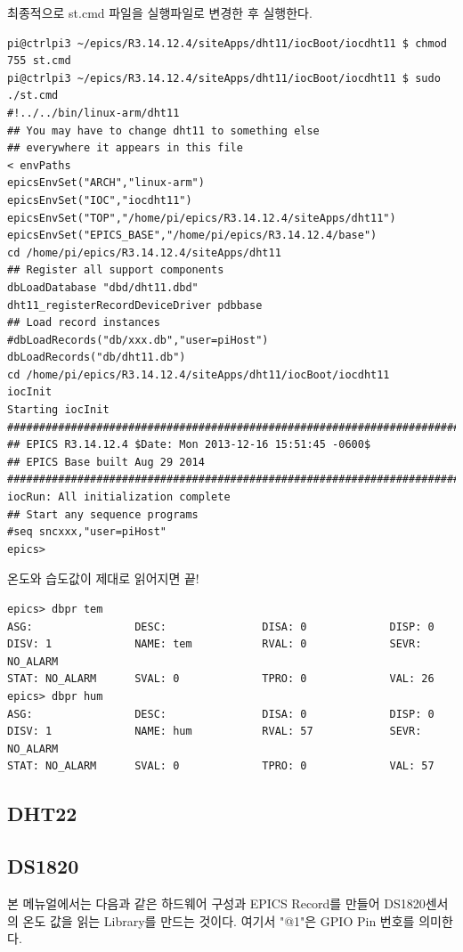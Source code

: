 \documentclass[11pt
  , a4paper
  , article
  , oneside
]{memoir}
\begin{document}
최종적으로 st.cmd 파일을 실행파일로 변경한 후 실행한다.
\begin{lstlisting}[style=termstyle]
pi@ctrlpi3 ~/epics/R3.14.12.4/siteApps/dht11/iocBoot/iocdht11 $ chmod 755 st.cmd
pi@ctrlpi3 ~/epics/R3.14.12.4/siteApps/dht11/iocBoot/iocdht11 $ sudo ./st.cmd
#!../../bin/linux-arm/dht11
## You may have to change dht11 to something else
## everywhere it appears in this file
< envPaths
epicsEnvSet("ARCH","linux-arm")
epicsEnvSet("IOC","iocdht11")
epicsEnvSet("TOP","/home/pi/epics/R3.14.12.4/siteApps/dht11")
epicsEnvSet("EPICS_BASE","/home/pi/epics/R3.14.12.4/base")
cd /home/pi/epics/R3.14.12.4/siteApps/dht11
## Register all support components
dbLoadDatabase "dbd/dht11.dbd"
dht11_registerRecordDeviceDriver pdbbase
## Load record instances
#dbLoadRecords("db/xxx.db","user=piHost")
dbLoadRecords("db/dht11.db")
cd /home/pi/epics/R3.14.12.4/siteApps/dht11/iocBoot/iocdht11
iocInit
Starting iocInit
############################################################################
## EPICS R3.14.12.4 $Date: Mon 2013-12-16 15:51:45 -0600$
## EPICS Base built Aug 29 2014
############################################################################
iocRun: All initialization complete
## Start any sequence programs
#seq sncxxx,"user=piHost"
epics> 
\end{lstlisting}
온도와 습도값이 제대로 읽어지면 끝!
\begin{lstlisting}[style=termstyle]
epics> dbpr tem
ASG:                DESC:               DISA: 0             DISP: 0             
DISV: 1             NAME: tem           RVAL: 0             SEVR: NO_ALARM      
STAT: NO_ALARM      SVAL: 0             TPRO: 0             VAL: 26     
epics> dbpr hum
ASG:                DESC:               DISA: 0             DISP: 0             
DISV: 1             NAME: hum           RVAL: 57            SEVR: NO_ALARM      
STAT: NO_ALARM      SVAL: 0             TPRO: 0             VAL: 57 
\end{lstlisting}

\subsection{DHT22}
\subsection{DS1820}
본 메뉴얼에서는 다음과 같은 하드웨어 구성과 EPICS Record를 만들어 DS1820센서의 온도 값을 읽는 Library를 만드는 것이다. 여기서 "@1"은 GPIO Pin 번호를 의미한다.
\end{document}
